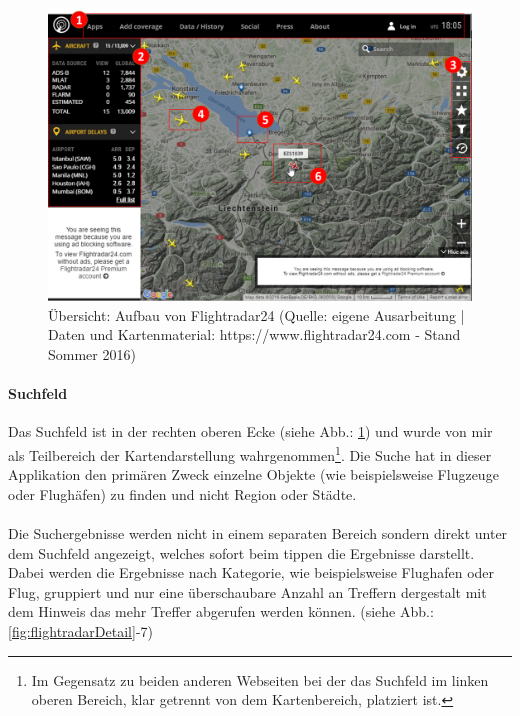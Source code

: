 \documentclass[../Bachelorarbeit.tex]{subfiles}
\begin{document}
\begin{figure}[H]
\centering
\includegraphics[width=1\linewidth]{img/StandDerTechnik/flightradarOverview}
\caption[Übersicht: Aufbau von Flightradar24]{Übersicht: Aufbau von Flightradar24 (Quelle: eigene Ausarbeitung | Daten und Kartenmaterial: https://www.flightradar24.com - Stand Sommer 2016)}
\label{fig:flightradarOverview}
\end{figure}

\paragraph{Suchfeld}
Das Suchfeld ist in der rechten oberen Ecke (siehe Abb.: \ref{fig:flightradarOverview}) und wurde von mir als Teilbereich der Kartendarstellung wahrgenommen\footnote{Im Gegensatz zu beiden anderen Webseiten bei der das Suchfeld im linken oberen Bereich, klar getrennt von dem Kartenbereich, platziert ist.}. 
Die Suche hat in dieser Applikation den primären Zweck einzelne Objekte (wie beispielsweise Flugzeuge oder Flughäfen) zu finden und nicht Region oder Städte.\\
\\
Die Suchergebnisse werden nicht in einem separaten Bereich sondern direkt unter dem Suchfeld angezeigt, welches sofort beim tippen die Ergebnisse darstellt.  
Dabei werden die Ergebnisse nach Kategorie, wie beispielsweise Flughafen oder Flug, gruppiert und nur eine überschaubare Anzahl an Treffern dergestalt mit dem Hinweis das mehr Treffer abgerufen werden können.
(siehe Abb.: \ref{fig:flightradarDetail}-7)
\end{document}
